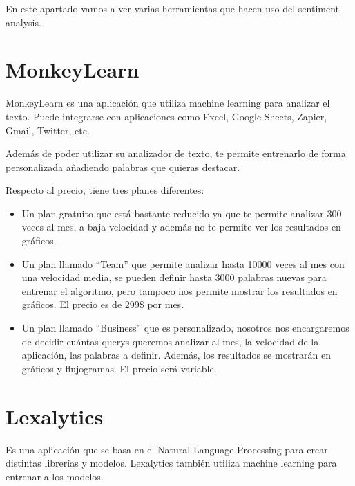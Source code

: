 
En este apartado vamos a ver varias herramientas que hacen uso del sentiment analysis.

\section{MonkeyLearn}
MonkeyLearn \cite{monkeylearn} es una aplicación que utiliza machine learning para analizar el texto. Puede integrarse con aplicaciones como Excel, Google Sheets, Zapier, Gmail, Twitter, etc. 

Además de poder utilizar su analizador de texto, te permite entrenarlo de forma personalizada añadiendo palabras que quieras destacar.

Respecto al precio, tiene tres planes diferentes:
\begin{itemize}
	
\item Un plan gratuito que está bastante reducido ya que te permite analizar 300 veces al mes, a baja velocidad y además no te permite ver los resultados en gráficos.
\item Un plan llamado “Team” que permite analizar hasta 10000 veces al mes con una velocidad media, se pueden definir hasta 3000 palabras nuevas para entrenar el algoritmo, pero tampoco nos permite mostrar los resultados en gráficos.
El precio es de 299\$ por mes.
\item Un plan llamado “Business” que es personalizado, nosotros nos encargaremos de decidir cuántas querys queremos analizar al mes, la velocidad de la aplicación, las palabras a definir. Además, los resultados se mostrarán en gráficos y flujogramas. 
El precio será variable.
\end{itemize}




\section{Lexalytics}
Es una aplicación que se basa en el Natural Language Processing para crear distintas librerías y modelos. Lexalytics \cite{lexalytics} también utiliza machine learning para entrenar a los modelos.


